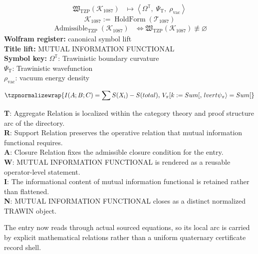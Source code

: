 \noindent
\begin{minipage}[t]{0.48\linewidth}
\begingroup
\small
\[
\begin{aligned}
\mathfrak{W}_{\mathrm{TZP}}\!\left(\mathcal{K}_{1087}\right)
&\longmapsto
\left\langle \Omega^{\mathbb{T}},\; \Psi_{\mathrm{T}},\; \rho_{\mathrm{vac}} \right\rangle
\end{aligned}
\]
\[
\mathcal{K}_{1087}
:=
\operatorname{HoldForm}\!\left(\mathcal{T}_{1087}\right)
\]
\[
\begin{aligned}
\operatorname{Admissible}_{\mathrm{TZP}}\!\left(\mathcal{K}_{1087}\right)
&\Longleftrightarrow
\mathfrak{W}_{\mathrm{TZP}}\!\left(\mathcal{K}_{1087}\right)\not\equiv\varnothing
\end{aligned}
\]
\textbf{Wolfram register:} canonical symbol lift\\
\textbf{Title lift:} MUTUAL INFORMATION FUNCTIONAL\\
\textbf{Symbol key:} \(\Omega^{\mathbb{T}}\): Trawinistic boundary curvature\\ \(\Psi_{\mathrm{T}}\): Trawinistic wavefunction\\ \(\rho_{\mathrm{vac}}\): vacuum energy density
\par
\endgroup
\end{minipage}\hfill
\begin{minipage}[t]{0.48\linewidth}
\[
\tzpnormalizewrap{I(A;B;C) = \sum S(X_{\mathrm{i}}) - S(total),\,V_\pi[k := Sum[,\,lvert \psi_\pi \rangle = Sum[}
\]

\small
\textbf{T}: Aggregate Relation is localized within the category theory and proof structure arc of the directory.\\
\textbf{R}: Support Relation preserves the operative relation that mutual information functional requires.\\
\textbf{A}: Closure Relation fixes the admissible closure condition for the entry.\\
\textbf{W}: MUTUAL INFORMATION FUNCTIONAL is rendered as a reusable operator-level statement.\\
\textbf{I}: The informational content of mutual information functional is retained rather than flattened.\\
\textbf{N}: MUTUAL INFORMATION FUNCTIONAL closes as a distinct normalized TRAWIN object.
\normalsize
\end{minipage}

The entry now reads through actual sourced equations, so its local arc is carried by explicit mathematical relations rather than a uniform quaternary certificate record shell.
\clearpage

